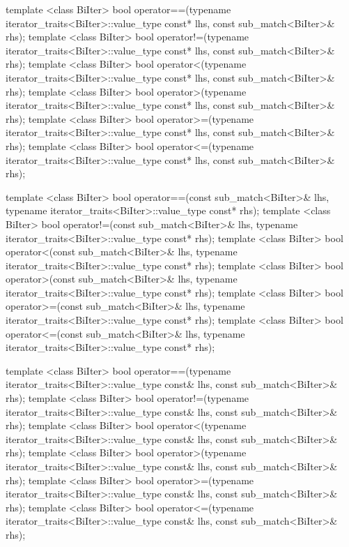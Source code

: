 \begin{codeblock}
{  template <class BiIter> 
    bool operator==(typename iterator_traits<BiIter>::value_type const* lhs, 
                    const sub_match<BiIter>& rhs); 
  template <class BiIter> 
    bool operator!=(typename iterator_traits<BiIter>::value_type const* lhs, 
                    const sub_match<BiIter>& rhs); 
  template <class BiIter> 
    bool operator<(typename iterator_traits<BiIter>::value_type const* lhs, 
                   const sub_match<BiIter>& rhs); 
  template <class BiIter> 
    bool operator>(typename iterator_traits<BiIter>::value_type const* lhs, 
                   const sub_match<BiIter>& rhs); 
  template <class BiIter> 
    bool operator>=(typename iterator_traits<BiIter>::value_type const* lhs, 
                    const sub_match<BiIter>& rhs); 
  template <class BiIter> 
    bool operator<=(typename iterator_traits<BiIter>::value_type const* lhs, 
                    const sub_match<BiIter>& rhs); 

  template <class BiIter> 
    bool operator==(const sub_match<BiIter>& lhs, 
                    typename iterator_traits<BiIter>::value_type const* rhs); 
  template <class BiIter> 
    bool operator!=(const sub_match<BiIter>& lhs, 
                    typename iterator_traits<BiIter>::value_type const* rhs); 
  template <class BiIter> 
    bool operator<(const sub_match<BiIter>& lhs, 
                   typename iterator_traits<BiIter>::value_type const* rhs); 
  template <class BiIter> 
    bool operator>(const sub_match<BiIter>& lhs, 
                   typename iterator_traits<BiIter>::value_type const* rhs); 
  template <class BiIter> 
    bool operator>=(const sub_match<BiIter>& lhs, 
                    typename iterator_traits<BiIter>::value_type const* rhs); 
  template <class BiIter> 
    bool operator<=(const sub_match<BiIter>& lhs, 
                    typename iterator_traits<BiIter>::value_type const* rhs); 

  template <class BiIter> 
    bool operator==(typename iterator_traits<BiIter>::value_type const& lhs, 
                    const sub_match<BiIter>& rhs); 
  template <class BiIter> 
    bool operator!=(typename iterator_traits<BiIter>::value_type const& lhs, 
                    const sub_match<BiIter>& rhs); 
  template <class BiIter> 
    bool operator<(typename iterator_traits<BiIter>::value_type const& lhs, 
                   const sub_match<BiIter>& rhs); 
  template <class BiIter> 
    bool operator>(typename iterator_traits<BiIter>::value_type const& lhs, 
                   const sub_match<BiIter>& rhs); 
  template <class BiIter> 
    bool operator>=(typename iterator_traits<BiIter>::value_type const& lhs, 
                    const sub_match<BiIter>& rhs); 
  template <class BiIter> 
    bool operator<=(typename iterator_traits<BiIter>::value_type const& lhs, 
                    const sub_match<BiIter>& rhs); 

}
\end{codeblock}
